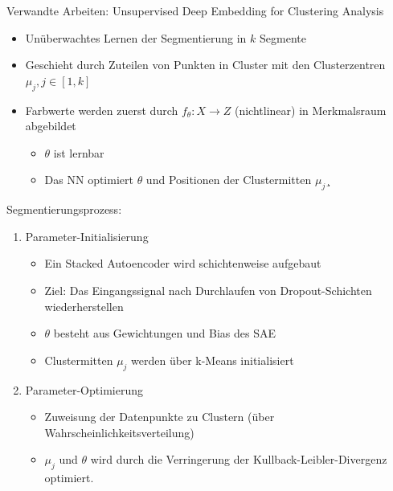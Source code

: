 \documentclass{beamer}
\begin{document}
\begin{frame}[allowframebreaks]{Verwandte Arbeiten: Unsupervised Deep Embedding for Clustering Analysis \cite{junyuan_16}}
\begin{itemize}
	\item Unüberwachtes Lernen der Segmentierung in $k$ Segmente
	\item Geschieht durch Zuteilen von Punkten in Cluster mit den Clusterzentren $\mu_j, j\in \left[1, k\right]$
	\item Farbwerte werden zuerst durch $f_\theta:X\rightarrow Z$ (nichtlinear) in Merkmalsraum abgebildet
	\begin{itemize}
		\item $\theta$ ist lernbar
		\item Das NN optimiert $\theta$ und Positionen der Clustermitten $\mu_j$¸
	\end{itemize}
\end{itemize}
\newpage
Segmentierungsprozess:
\begin{enumerate}
	\item Parameter-Initialisierung
	\begin{itemize}
		\item Ein Stacked Autoencoder wird schichtenweise aufgebaut
		\item Ziel: Das Eingangssignal nach Durchlaufen von Dropout-Schichten wiederherstellen
		\item $\theta$ besteht aus Gewichtungen und Bias des SAE
		\item Clustermitten $\mu_j$ werden über k-Means initialisiert
	\end{itemize}
\item Parameter-Optimierung
\begin{itemize}
	\item Zuweisung der Datenpunkte zu Clustern (über Wahrscheinlichkeitsverteilung)
	\item $\mu_j$ und $\theta$ wird durch die Verringerung der Kullback-Leibler-Divergenz optimiert.
\end{itemize}
\end{enumerate}
\end{frame}
\end{document}
